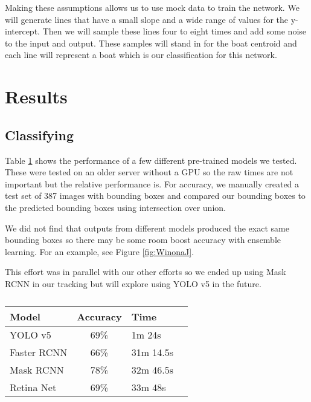 \documentclass[10pt,twocolumn,letterpaper]{article}
\begin{document}
Making these assumptions allows us to use mock data to train the network. We will generate lines that have a small slope and a wide range of values for the y-intercept. Then we will sample these lines four to eight times and add some noise to the input and output. These samples will stand in for the boat centroid and each line will represent a boat which is our classification for this network.

\section{Results} 

\subsection{Classifying}

Table \ref{tab:ModelPerf} shows the performance of a few different pre-trained models we tested. These were tested on an older server without a GPU so the raw times are not important but the relative performance is. For accuracy, we manually created a test set of 387 images with bounding boxes and compared our bounding boxes to the predicted bounding boxes using intersection over union.

We did not find that outputs from different models produced the exact same bounding boxes so there may be some room boost accuracy with ensemble learning. For an example, see Figure \ref{fig:WinonaJ}.

This effort was in parallel with our other efforts so we ended up using Mask RCNN in our tracking but will explore using YOLO v5 in the future.

\begin{table}[t]
  \centering
  \begin{tabular}{@{}lc@{}lc@{}}
    \toprule
    Model & Accuracy\nobreakspace\nobreakspace\nobreakspace & \nobreakspace\nobreakspace Time \\
    \midrule
    YOLO v5\cite{pytorch_yolov5} & 69\% & 1m 24s \\
    Faster RCNN\cite{pytorch_fasterrcnn_resnet50_fpn} & 66\% & 31m 14.5s \\
    Mask RCNN\cite{pytorch_maskrcnn_resnet50_fpn} & 78\% & 32m 46.5s\\
    Retina Net\cite{pytorch_retinanet_resnet50_fpn} & 69\% & 33m 48s\\
    \bottomrule
  \end{tabular}
  \caption{}
  \label{tab:ModelPerf}
\end{table}
\end{document}
